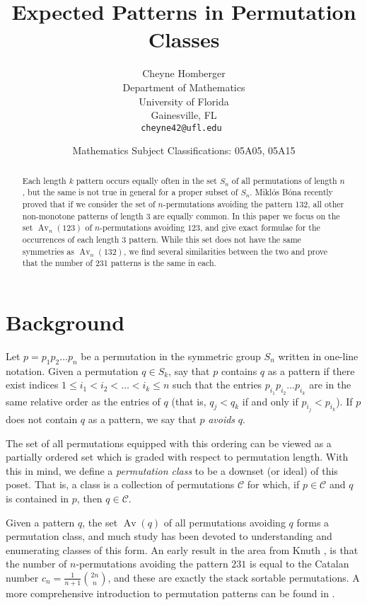 \documentclass[11pt]{article} %
\title{\sc Expected Patterns in Permutation Classes}
\author{Cheyne Homberger \\
  \small Department of Mathematics \\[-0.8ex]
  \small University of Florida \\[-0.8ex]
  \small Gainesville, FL \\
  \small\tt cheyne42@ufl.edu }
\date{\small Mathematics Subject Classifications: 05A05, 05A15}
\theoremstyle{plain}
\theoremstyle{definition}
\newcommand{\C}{\mathcal{C}}
\DeclareMathOperator{\Av}{Av}
\begin{document}
  \maketitle


  \begin{abstract}
    Each length $k$ pattern occurs equally often in the set $S_n$ of
    all permutations of length $n$, but the same is not true in
    general for a proper subset of $S_n$.  Mikl\'os B\'ona recently
    proved that if we consider the set of $n$-permutations avoiding
    the pattern 132, all other non-monotone patterns of length 3 are
    equally common. In this paper we focus on the set
    $\operatorname{Av}_n (123)$ of $n$-permutations avoiding $123$,
    and give exact formulae for the occurrences of each length 3
    pattern. While this set does not have the same symmetries as
    $\operatorname{Av}_n (132)$, we find several similarities between
    the two and prove that the number of 231 patterns is the same in
    each.
  \end{abstract}


\section{Background}

  Let $p = p_1 p_2 \ldots p_n$ be a permutation in the symmetric group
  $S_n$ written in one-line notation. Given a permutation $q \in S_k$,
  say that $p$ contains $q$ as a pattern if there exist indices $ 1
  \leq i_1 < i_2 < \ldots < i_k \leq n$ such that the entries $p_{i_1}
  p_{i_2} \ldots p_{i_k}$ are in the same relative order as the
  entries of $q$ (that is, $q_j < q_k$ if and only if $p_{i_j} <
  p_{i_k}$).  If $p$ does not contain $q$ as a pattern, we say that
  $p$ \emph{avoids} $q$.

  The set of all permutations equipped with this ordering can be
  viewed as a partially ordered set which is graded with respect to
  permutation length.  With this in mind, we define a
  \emph{permutation class} to be a downset (or ideal) of this poset.
  That is, a class is a collection of permutations $\C$ for which, if
  $p \in \C$ and $q$ is contained in $p$, then $q \in \C$.

  Given a pattern $q$, the set $\Av (q)$ of all permutations avoiding $q$
  forms a permutation class, and much study has been devoted
  to understanding and enumerating classes of this form.  An early
  result in the area from Knuth \cite{knuth3}, is that the number of
  $n$-permutations avoiding the pattern $231$ is equal to the Catalan
  number $c_n = \frac{1}{n+1} \binom{2n}{n}$, and these are exactly
  the stack sortable permutations. A more comprehensive introduction
  to permutation patterns can be found in \cite{bonabook}.
\end{document}

